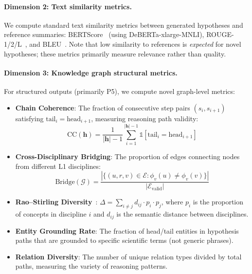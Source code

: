 \documentclass{article}
\begin{document}
\paragraph{Dimension 2: Text similarity metrics.}
We compute standard text similarity metrics between generated hypotheses and reference summaries:
BERTScore~\cite{zhang2019bertscore} (using DeBERTa-xlarge-MNLI), ROUGE-1/2/L~\cite{lin2004rouge}, and BLEU~\cite{papineni2002bleu}.
Note that low similarity to references is \emph{expected} for novel hypotheses; these metrics primarily measure relevance rather than quality.

\paragraph{Dimension 3: Knowledge graph structural metrics.}
For structured outputs (primarily P5), we compute novel graph-level metrics:

\begin{itemize}[leftmargin=*,topsep=1pt,itemsep=0pt]
\item \textbf{Chain Coherence}: The fraction of consecutive step pairs $(s_i, s_{i+1})$ satisfying $\text{tail}_i = \text{head}_{i+1}$, measuring reasoning path validity:
\begin{equation}
\text{CC}(\mathbf{h}) = \frac{1}{|\mathbf{h}|-1} \sum_{i=1}^{|\mathbf{h}|-1} \mathbb{1}[\text{tail}_i = \text{head}_{i+1}]
\end{equation}
\item \textbf{Cross-Disciplinary Bridging}: The proportion of edges connecting nodes from different L1 disciplines:
\begin{equation}
\text{Bridge}(\mathcal{G}) = \frac{|\{(u,r,v) \in \mathcal{E} : \phi_v(u) \neq \phi_v(v)\}|}{|\mathcal{E}_{\text{valid}}|}
\end{equation}
\item \textbf{Rao--Stirling Diversity}~\cite{stirling2007general}: $\Delta = \sum_{i \neq j} d_{ij} \cdot p_i \cdot p_j$, where $p_i$ is the proportion of concepts in discipline $i$ and $d_{ij}$ is the semantic distance between disciplines.
\item \textbf{Entity Grounding Rate}: The fraction of head/tail entities in hypothesis paths that are grounded to specific scientific terms (not generic phrases).
\item \textbf{Relation Diversity}: The number of unique relation types divided by total paths, measuring the variety of reasoning patterns.
\end{itemize}
\end{document}
